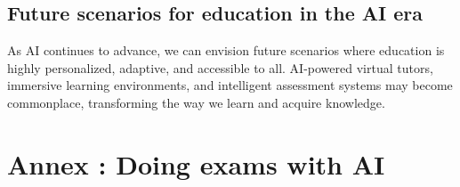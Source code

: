 \documentclass{article}
\begin{document}
\subsection{Future scenarios for education in the AI era}
As AI continues to advance, we can envision future scenarios where education is highly personalized, adaptive, and accessible to all. AI-powered virtual tutors, immersive learning environments, and intelligent assessment systems may become commonplace, transforming the way we learn and acquire knowledge.

\newpage
\newpage
\section*{Annex : Doing exams with AI}

\cite{einstein}




\end{document}

